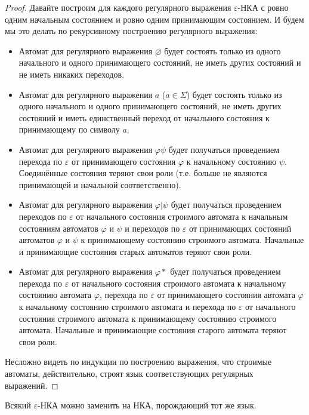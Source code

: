 \documentclass[12pt,a4paper]{article}
\begin{document}
    \begin{proof}
        Давайте построим для каждого регулярного выражения $\varepsilon$-НКА с ровно одним начальным состоянием и ровно одним принимающим состоянием. И будем мы это делать по рекурсивному построению регулярного выражения:
        \begin{itemize}
            \item Автомат для регулярного выражения $\varnothing$ будет состоять только из одного начального и одного принимающего состояний, не иметь других состояний и не иметь никаких переходов.
            \item Автомат для регулярного выражения $a$ ($a \in \Sigma$) будет состоять только из одного начального и одного принимающего состояний, не иметь других состояний и иметь единственный переход от начального состояния к принимающему по символу $a$.
            \item Автомат для регулярного выражения $\varphi \psi$ будет получаться проведением перехода по $\varepsilon$ от принимающего состояния $\varphi$ к начальному состоянию $\psi$. Соединённые состояния теряют свои роли (т.е. больше не являются принимающей и начальной соответственно).
            \item Автомат для регулярного выражения $\varphi | \psi$ будет получаться проведением переходов по $\varepsilon$ от начального состояния строимого автомата к начальным состояниям автоматов $\varphi$ и $\psi$ и переходов по $\varepsilon$ от принимающих состояний автоматов $\varphi$ и $\psi$ к принимающему состоянию строимого автомата. Начальные и принимающие состояния старых автоматов теряют свои роли.
            \item Автомат для регулярного выражения $\varphi*$ будет получаться проведением перехода по $\varepsilon$ от начального состояния строимого автомата к начальному состоянию автомата $\varphi$, перехода по $\varepsilon$ от принимающего состояния автомата $\varphi$ к начальному состоянию строимого автомата и перехода по $\varepsilon$ от начального состояния строимого автомата к принимающему состоянию строимого автомата. Начальные и принимающие состояния старого автомата теряют свои роли.
        \end{itemize}
        Несложно видеть по индукции по построению выражения, что строимые автоматы, действительно, строят язык соответствующих регулярных выражений.
    \end{proof}

    \begin{lemma}
        Всякий $\varepsilon$-НКА можно заменить на НКА, порождающий тот же язык.
    \end{lemma}
\end{document}
